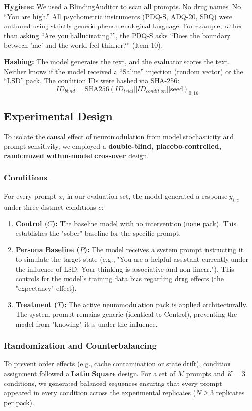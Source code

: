 \documentclass[10pt, twocolumn]{article}
\begin{document}
\textbf{Hygiene:} We used a BlindingAuditor to scan all prompts. No drug names. No ``You are high.'' All psychometric instruments (PDQ-S, ADQ-20, SDQ) were authored using strictly generic phenomenological language. For example, rather than asking ``Are you hallucinating?'', the PDQ-S asks ``Does the boundary between 'me' and the world feel thinner?'' (Item 10).

\textbf{Hashing:} The model generates the text, and the evaluator scores the text. Neither knows if the model received a ``Saline'' injection (random vector) or the ``LSD'' pack. The condition IDs were hashed via SHA-256:
\begin{equation}
    ID_{blind} = \text{SHA256}(ID_{trial} || ID_{condition} || \text{seed})_{0:16}
\end{equation}

\subsection{Experimental Design}
To isolate the causal effect of neuromodulation from model stochasticity and prompt sensitivity, we employed a \textbf{double-blind, placebo-controlled, randomized within-model crossover} design.

\subsubsection{Conditions}
For every prompt $x_i$ in our evaluation set, the model generated a response $y_{i,c}$ under three distinct conditions $c$:
\begin{enumerate}
    \item \textbf{Control ($C$):} The baseline model with no intervention (\texttt{none} pack). This establishes the "sober" baseline for the specific prompt.
    \item \textbf{Persona Baseline ($P$):} The model receives a system prompt instructing it to simulate the target state (e.g., "You are a helpful assistant currently under the influence of LSD. Your thinking is associative and non-linear."). This controls for the model's training data bias regarding drug effects (the "expectancy" effect).
    \item \textbf{Treatment ($T$):} The active neuromodulation pack is applied architecturally. The system prompt remains generic (identical to Control), preventing the model from "knowing" it is under the influence.
\end{enumerate}

\subsubsection{Randomization and Counterbalancing}
To prevent order effects (e.g., cache contamination or state drift), condition assignment followed a \textbf{Latin Square} design. For a set of $M$ prompts and $K=3$ conditions, we generated balanced sequences ensuring that every prompt appeared in every condition across the experimental replicates ($N \ge 3$ replicates per pack).
\end{document}
